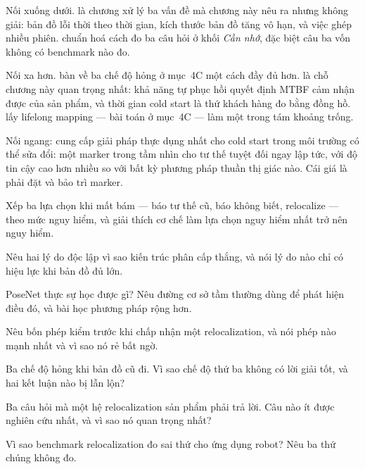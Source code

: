 \documentclass[../../vslam.tex]{subfiles}
\begin{document}
Nối xuống dưới.  là chương xử lý ba vấn đề mà chương này nêu ra nhưng không giải: bản đồ lỗi thời theo thời gian, kích thước bản đồ tăng vô hạn, và việc ghép nhiều phiên.  chuẩn hoá cách đo ba câu hỏi ở khối \emph{Cần nhớ}, đặc biệt câu ba vốn không có benchmark nào đo.

Nối xa hơn.  bàn về ba chế độ hỏng ở mục~4C một cách đầy đủ hơn.  là chỗ chương này quan trọng nhất: khả năng tự phục hồi quyết định MTBF cảm nhận được của sản phẩm, và thời gian cold start là thứ khách hàng đo bằng đồng hồ.  lấy lifelong mapping --- bài toán ở mục~4C --- làm một trong tám khoảng trống.

Nối ngang:  cung cấp giải pháp thực dụng nhất cho cold start trong môi trường có thể sửa đổi: một marker trong tầm nhìn cho tư thế tuyệt đối ngay lập tức, với độ tin cậy cao hơn nhiều so với bất kỳ phương pháp thuần thị giác nào. Cái giá là phải đặt và bảo trì marker.

\begin{tukiem}
\item Xếp ba lựa chọn khi mất bám --- báo tư thế cũ, báo không biết, relocalize --- theo mức nguy hiểm, và giải thích cơ chế làm lựa chọn nguy hiểm nhất trở nên nguy hiểm.
\item Nêu hai lý do độc lập vì sao kiến trúc phân cấp thắng, và nói lý do nào chỉ có hiệu lực khi bản đồ đủ lớn.
\item PoseNet thực sự học được gì? Nêu đường cơ sở tầm thường dùng để phát hiện điều đó, và bài học phương pháp rộng hơn.
\item Nêu bốn phép kiểm trước khi chấp nhận một relocalization, và nói phép nào mạnh nhất và vì sao nó rẻ bất ngờ.
\item Ba chế độ hỏng khi bản đồ cũ đi. Vì sao chế độ thứ ba không có lời giải tốt, và hai kết luận nào bị lẫn lộn?
\item Ba câu hỏi mà một hệ relocalization sản phẩm phải trả lời. Câu nào ít được nghiên cứu nhất, và vì sao nó quan trọng nhất?
\item Vì sao benchmark relocalization đo sai thứ cho ứng dụng robot? Nêu ba thứ chúng không đo.
\end{tukiem}
\ifSubfilesClassLoaded{\printbibliography[title={Nguồn}]}{}
\end{document}
